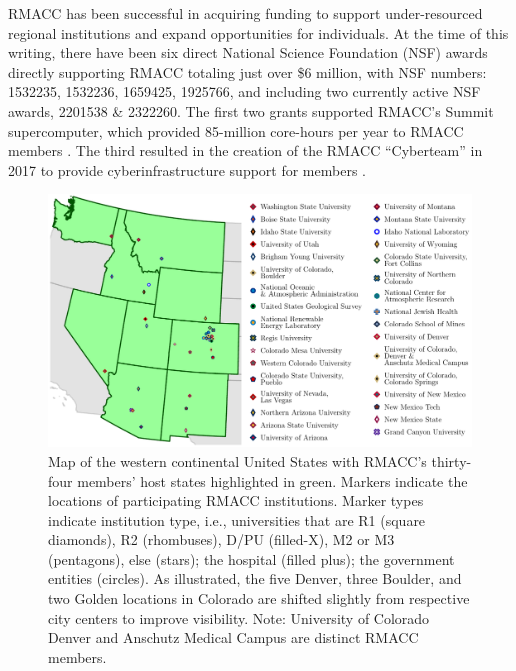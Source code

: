 \documentclass[sigconf]{acmart}
\theoremstyle{plain}
\begin{document}
RMACC has been successful in acquiring funding to support
under-resourced regional institutions and expand opportunities for
individuals. At the time of this writing, there have been six direct
National Science Foundation (NSF) awards directly supporting RMACC totaling
just over \$6 million, with NSF numbers:
1532235, 
1532236, 
1659425, 
1925766, 
and including two currently active NSF awards, 
2201538 \& 
2322260. 
The first two grants supported RMACC's Summit supercomputer, which
provided 85-million core-hours per year to RMACC members
\cite{RMACC:Summit:PEARC17}. The third resulted in the creation of the
RMACC ``Cyberteam'' in 2017 to provide cyberinfrastructure support for
members \cite{RMACC:CITeam:PEARC19,RMACC:CITeam:Survey:OSF19}.

\begin{figure}[t]
\centering
\includegraphics[width=1\linewidth]{figs/RMACC-members-with-legend.pdf}
\caption{%
  Map of the western continental United States with RMACC's thirty-four
  members' host states highlighted in green. Markers indicate the
  locations of participating RMACC institutions. Marker types indicate
  institution type, i.e., universities that are R1 (square diamonds), R2
  (rhombuses), D/PU (filled-X), M2 or M3 (pentagons), else (stars); the
  hospital (filled plus); the government entities (circles).  As
  illustrated, the five Denver, three Boulder, and two Golden locations
  in Colorado are shifted slightly from respective city centers to
  improve visibility. Note: University of Colorado Denver and Anschutz
  Medical Campus are distinct RMACC members.%
}
\label{fig:members}
\end{figure}
\end{document}
